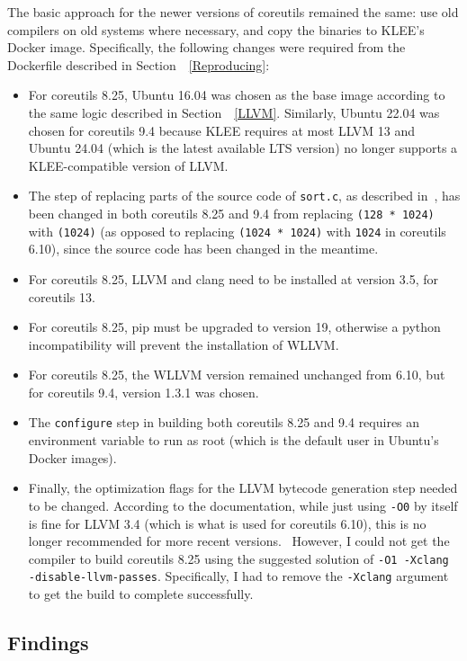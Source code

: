 \documentclass{article}
\let\savedCite=\cite
\renewcommand{\cite}{\unskip~\savedCite}
\let\savedRef=\ref
\renewcommand{\ref}{\unskip~\savedRef}
\begin{document}
The basic approach for the newer versions of coreutils remained the same: use old compilers on old systems where necessary, and copy the binaries to KLEE's Docker image. Specifically, the following changes were required from the Dockerfile described in Section~\ref{Reproducing}:
\begin{itemize}
    \item For coreutils 8.25, Ubuntu 16.04 was chosen as the base image according to the same logic described in Section~\ref{LLVM}. Similarly, Ubuntu 22.04 was chosen for coreutils 9.4 because KLEE requires at most LLVM 13 and Ubuntu 24.04 (which is the latest available LTS version) no longer supports a KLEE-compatible version of LLVM.
    \item The step of replacing parts of the source code of \lstinline{sort.c}, as described in\cite{KLEEFAQ}, has been changed in both coreutils 8.25 and 9.4 from replacing \lstinline{(128 * 1024)} with \lstinline{(1024)} (as opposed to replacing \lstinline{(1024 * 1024)} with \lstinline{1024} in coreutils 6.10), since the source code has been changed in the meantime.
    \item For coreutils 8.25, LLVM and clang need to be installed at version 3.5, for coreutils 13.
    \item For coreutils 8.25, pip must be upgraded to version 19, otherwise a python incompatibility will prevent the installation of WLLVM.
    \item For coreutils 8.25, the WLLVM version remained unchanged from 6.10, but for coreutils 9.4, version 1.3.1 was chosen.
    \item The \lstinline{configure} step in building both coreutils 8.25 and 9.4 requires an environment variable to run as root (which is the default user in Ubuntu's Docker images).
    \item Finally, the optimization flags for the LLVM bytecode generation step needed to be changed. According to the documentation, while just using \lstinline{-O0} by itself is fine for LLVM 3.4 (which is what is used for coreutils 6.10), this is no longer recommended for more recent versions.\cite{KLEETutorial, KLEEIssue} However, I could not get the compiler to build coreutils 8.25 using the suggested solution of \lstinline{-O1 -Xclang -disable-llvm-passes}. Specifically, I had to remove the \lstinline{-Xclang} argument to get the build to complete successfully.
\end{itemize}

\subsection{Findings}
\end{document}
